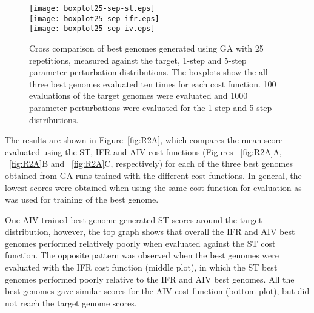\begin{figure}[tb!]
  \centering
  \texttt{[image: boxplot25-sep-st.eps]}\\
  \texttt{[image: boxplot25-sep-ifr.eps]}\\
  \texttt{[image: boxplot25-sep-iv.eps]}\\
  \caption{Cross comparison of best genomes generated using GA with 25
    repetitions, measured against the target, 1-step and 5-step
    parameter perturbation distributions.  The boxplots show the all
    three best genomes evaluated ten times for each cost function. 100
    evaluations of the target genomes were evaluated and 1000
    parameter perturbations were evaluated for the 1-step and 5-step
    distributions.}\label{fig:R2}
\end{figure}

\medskip{}

The results are shown in Figure~\ref{fig:R2A}, which compares the mean score
evaluated using the ST, IFR and AIV cost functions (Figures ~\ref{fig:R2A}A,
~\ref{fig:R2A}B and ~\ref{fig:R2A}C, respectively) for each of the three best genomes
obtained from GA runs trained with the different cost functions. In general, the
lowest scores were obtained when using the same cost function for evaluation as
was used for training of the best genome. 

\medskip{}

One AIV trained best genome generated ST scores around the target distribution,
however, the top graph shows that overall the IFR and AIV best genomes performed
relatively poorly when evaluated against the ST cost function.  The opposite
pattern was observed when the best genomes were evaluated with the IFR cost
function (middle plot), in which the ST best genomes performed poorly relative
to the IFR and AIV best genomes. All the best genomes gave similar scores for
the AIV cost function (bottom plot), but did not reach the target genome scores.


